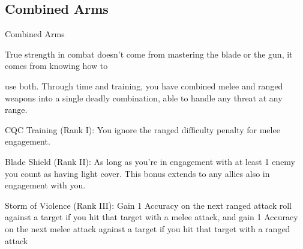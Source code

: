 \subsection{Combined Arms}

                                             Combined Arms

True strength in combat doesn’t come from mastering the blade or the gun, it comes from knowing how to

use both. Through time and training, you have combined melee and ranged weapons into a single deadly
combination, able to handle any threat at any range.

CQC Training (Rank I): You ignore the ranged difficulty penalty for melee engagement.

Blade Shield (Rank II): As long as you’re in engagement with at least 1 enemy you count as
having light cover. This bonus extends to any allies also in engagement with you.

Storm of Violence (Rank III): Gain 1 Accuracy on the next ranged attack roll against a target if
you hit that target with a melee attack, and gain 1 Accuracy on the next melee attack against a
target if you hit that target with a ranged attack